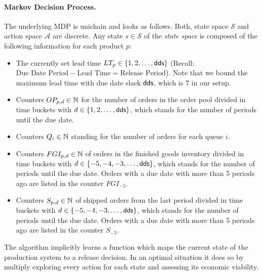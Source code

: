\documentclass[envcountsame]{llncs}
\begin{document}
\paragraph{Markov Decision Process.} The underlying MDP is unichain and looks as follows.
Both, state space $\mathcal{S}$ and action space $\mathcal{A}$ are discrete. Any state
$s \in \mathcal{S}$ of the \textit{state space} is composed of the following information for each
product $p$:
\begin{itemize}

\item The currently set lead time $LT_{p} \in \{1,2,\ldots,\textsf{dds}\}$ (Recall:
  $\text{Due Date Period} - \text{Lead Time} = \text{Release Period}$). Note that we bound the
  maximum lead time with due date slack $\textsf{dds}$, which is $7$ in our setup.

\item Counters $OP_{p,d}\in \mathbb{N}$ for the number of orders in the order pool divided in time buckets
  with $d \in \{1,2,\ldots,\textsf{dds} \}$, which stands for the number of periods until the due date.


\item Counters $Q_{i}\in \mathbb{N}$ standing for the number of orders for each queue $i$.

\item Counters $FGI_{p,d} \in \mathbb{N}$ of orders in the finished goods inventory divided in time
  buckets with $d \in \{-5,-4,-3,\ldots, \textsf{dds} \}$, which stands for the number of periods until the
  due date. Orders with a due date with more than 5 periods ago are listed in the counter
  $FGI_{-5}$.

\item Counters $S_{p,d} \in \mathbb{N}$ of shipped orders from the last period divided in time buckets
  with $d \in\{-5,-4,-3,\ldots, \textsf{dds} \}$, which stands for the number of periods until the due date.
  Orders with a due date with more than 5 periods ago are listed in the counter $S_{-5}$.

\end{itemize}

\noindent The algorithm implicitly learns a function which maps the current state of the
production system to a release decision. In an optimal situation it does so by multiply exploring
every action for each state and assessing its economic viability.
\end{document}
